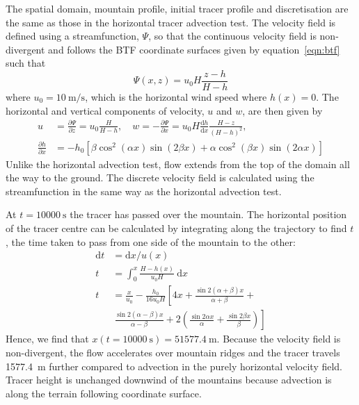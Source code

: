 \documentclass[twocol]{ametsoc}
\begin{document}
The spatial domain, mountain profile, initial tracer profile and discretisation are the same as those in the horizontal tracer advection test.  The velocity field is defined using a streamfunction, $\Psi$, so that the continuous velocity field is non-divergent and follows the BTF coordinate surfaces given by equation~\ref{eqn:btf} such that
\begin{equation}
	\Psi(x,z) = u_0 H \frac{z - h}{H - h}
\end{equation}
where $u_0 = \SI{10}{\meter\per\second}$, which is the horizontal wind speed where $h(x) = 0$.
The horizontal and vertical components of velocity, $u$ and $w$, are then given by
\begin{align}
	u &= \frac{\partial \Psi}{\partial z} = u_0 \frac{H}{H - h}, \quad w = -\frac{\partial \Psi}{\partial x} = u_0 H \frac{\mathrm{d} h}{\mathrm{d} x} \frac{H - z}{\left( H - h \right)^2}, \nonumber \\
	\frac{\partial h}{\partial x} &= - h_0 \left[ 
		\beta \cos^2 \left( \alpha x \right) \sin \left( 2 \beta x \right) +
		\alpha \cos^2 \left( \beta x \right) \sin \left( 2 \alpha x \right)
	\right]
\end{align}
Unlike the horizontal advection test, flow extends from the top of the domain all the way to the ground.  The discrete velocity field is calculated using the streamfunction in the same way as the horizontal advection test.

At $t = \SI{10000}{\second}$ the tracer has passed over the mountain.  The horizontal position of the tracer centre can be calculated by integrating along the trajectory to find $t$, the time taken to pass from one side of the mountain to the other:
\begin{align}
	\mathrm{d}t &= \mathrm{d}x / u(x) \\
	t &= \int_0^x \frac{H - h(x)}{u_0 H}\:\mathrm{d}x \\
	t &= \frac{x}{u_0} - \frac{h_0}{16 u_0 H} \left[ 4x + \frac{\sin 2 (\alpha + \beta) x}{\alpha + \beta} \right.+ \nonumber \\
   &\ \left. \frac{\sin 2(\alpha - \beta) x}{\alpha - \beta} + 2 \left( \frac{\sin 2\alpha x}{\alpha} + \frac{\sin 2\beta x}{\beta} \right) \right]
\end{align}
Hence, we find that \(x(t=\SI{10000}{\second}) = \SI{51577.4}{\meter}\).  Because the velocity field is non-divergent, the flow accelerates over mountain ridges and the tracer travels \SI{1577.4}{\meter} further compared to advection in the purely horizontal velocity field.  Tracer height is unchanged downwind of the mountains because advection is along the terrain following coordinate surface.
\end{document}
